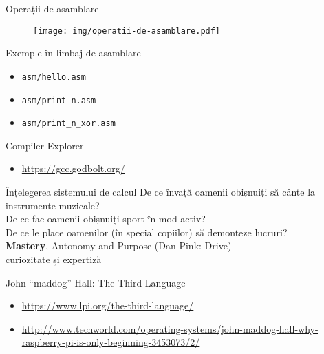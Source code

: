 \documentclass{simple}
\begin{document}
\begin{frame}{Operații de asamblare}
  \begin{figure}
    \centering
    \texttt{[image: img/operatii-de-asamblare.pdf]}
  \end{figure}
\end{frame}

\begin{frame}{Exemple în limbaj de asamblare}
  \begin{itemize}
    \item \texttt{asm/hello.asm}
    \item \texttt{asm/print\_n.asm}
    \item \texttt{asm/print\_n\_xor.asm}
  \end{itemize}
\end{frame}

\begin{frame}{Compiler Explorer}
  \begin{itemize}
    \item \url{https://gcc.godbolt.org/}
  \end{itemize}
\end{frame}

\begin{frame}{Înțelegerea sistemului de calcul}
  \centering
  \pause De ce învață oamenii obișnuiți să cânte la instrumente muzicale? \\
  \pause De ce fac oamenii obișnuiți sport în mod activ? \\
  \pause De ce le place oamenilor (în special copiilor) să demonteze lucruri? \\
  \vspace{5mm}
  \pause \textbf{Mastery}, Autonomy and Purpose (Dan Pink: Drive)\\
  \vspace{5mm}
  \pause curiozitate și expertiză
\end{frame}

\begin{frame}{John ``maddog'' Hall: The Third Language}
  \begin{itemize}
    \item \footnotesize{\url{https://www.lpi.org/the-third-language/}}
    \item \footnotesize{\url{http://www.techworld.com/operating-systems/john-maddog-hall-why-raspberry-pi-is-only-beginning-3453073/2/}}
  \end{itemize}
\end{frame}
\end{document}
